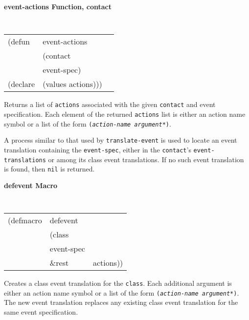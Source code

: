 \documentclass[twoside]{book}
\begin{document}
\begin{sloppy}
\begin{flushright}
{}\end{flushright}


{\samepage
{\large {\bf event-actions \hfill Function, contact}}
\begin{flushright} \parbox[t]{6.125in}{
\tt
\begin{tabular}{lll}
\raggedright
(defun & event-actions & \\ 
& (contact\\
&  event-spec)\\
(declare & (values actions)))
\end{tabular}
\rm

}\end{flushright}
}

\begin{flushright} \parbox[t]{6.125in}{
Returns a list of {\tt actions} associated with the given {\tt contact} and
event specification. 
Each element of the returned  {\tt actions} list is either an action name symbol
or a list of the form {\tt ({\em action-name argument*})}. 

A process similar to that used by {\tt translate-event} is used to locate an
event translation containing the {\tt event-spec}, either in the {\tt contact}'s
{\tt event-translations} or among its class event translations. If no such event
translation is found, then {\tt nil} is returned.

}\end{flushright}



{\samepage
{\large {\bf defevent \hfill Macro}} 
\begin{flushright} \parbox[t]{6.125in}{
\tt
\begin{tabular}{lll}
\raggedright
(defmacro & defevent \\ 
& (class\\
&  event-spec\\
& \&rest & actions))
\end{tabular}
\rm

}\end{flushright}
}

\begin{flushright} \parbox[t]{6.125in}{
Creates a class event translation for the {\tt class}.
Each additional argument is either an action name symbol or a list of the form
{\tt ({\em action-name argument*})}.
The new event translation replaces
any existing class event translation for the same event specification.

}
\end{flushright}
\end{sloppy}
\end{document}
